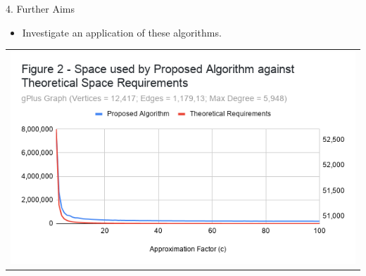 \documentclass[ %
                    author={Dominic Hutchinson},
                supervisor={Dr. Christian Konrad},
                    degree={MEng Maths  and Computer Science},
                     title={Implementing and Evaluating Space Efficient Algorithms for Detecting Large Neighbourhoods in Graph Streams},
                  subtitle={},
                      type={Research},
                      year={2020} ]{poster}
\begin{document}
\begin{frame}{}
\begin{columns}[t]
\begin{column}{0.422\linewidth}
\begin{block}{\Large 4. Further Aims}
\begin{itemize}
  \item Investigate an application of these algorithms.
  \end{itemize}
	\begin{center}\begin{tabular}{c}
	\includegraphics[scale=1]{img/Figure2.png}
	\end{tabular}\end{center}
  \end{block}
  \end{column}
\end{columns}

\vfill

\end{frame}

\end{document}
